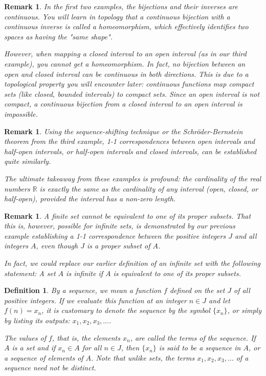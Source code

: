 \documentclass{article}
\theoremstyle{mythm}
\newtheorem{definition}[theorem]{Definition}
\newtheorem{remark}[theorem]{Remark}
\begin{document}
\begin{remark}
In the first two examples, the bijections and their inverses are continuous. You will learn in topology that a continuous bijection with a continuous inverse is called a \textit{homeomorphism}, which effectively identifies two spaces as having the "same shape". 

However, when mapping a closed interval to an open interval (as in our third example), you cannot get a homeomorphism. In fact, no bijection between an open and closed interval can be continuous in both directions. This is due to a topological property you will encounter later: continuous functions map \textit{compact} sets (like closed, bounded intervals) to compact sets. Since an open interval is not compact, a continuous bijection from a closed interval to an open interval is impossible.
\end{remark}

\begin{remark}
Using the sequence-shifting technique or the Schröder-Bernstein theorem from the third example, 1-1 correspondences between open intervals and half-open intervals, or half-open intervals and closed intervals, can be established quite similarly. 

The ultimate takeaway from these examples is profound: the cardinality of the real numbers $\mathbb{R}$ is exactly the same as the cardinality of any interval (open, closed, or half-open), provided the interval has a non-zero length.
\end{remark}
\begin{remark}
A finite set cannot be equivalent to one of its proper subsets. That this is, however, possible for infinite sets, is demonstrated by our previous example establishing a 1-1 correspondence between the positive integers $J$ and all integers $A$, even though $J$ is a proper subset of $A$.

In fact, we could replace our earlier definition of an infinite set with the following statement: A set $A$ is infinite if $A$ is equivalent to one of its proper subsets.
\end{remark}
\begin{definition}
By a \textit{sequence}, we mean a function $f$ defined on the set $J$ of all positive integers. If we evaluate this function at an integer $n \in J$ and let $f(n) = x_n$, it is customary to denote the sequence by the symbol $\{x_n\}$, or simply by listing its outputs: $x_1, x_2, x_3, \dots$. 

The values of $f$, that is, the elements $x_n$, are called the \textit{terms} of the sequence. If $A$ is a set and if $x_n \in A$ for all $n \in J$, then $\{x_n\}$ is said to be a \textit{sequence in $A$}, or a sequence of elements of $A$. Note that unlike sets, the terms $x_1, x_2, x_3, \dots$ of a sequence need not be distinct.
\end{definition}
\end{document}
